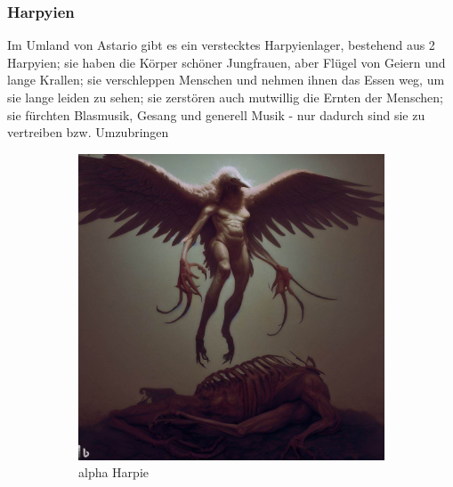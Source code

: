 \documentclass[11pt, twoside]{article}
\begin{document}
\subsubsection{Harpyien\label{harpie}}
\label{sec:orgedf501a}
Im Umland von Astario gibt es ein verstecktes Harpyienlager, bestehend aus 2 Harpyien; sie haben die Körper schöner Jungfrauen, aber Flügel von Geiern und lange Krallen; sie verschleppen Menschen und nehmen ihnen das Essen weg, um sie lange leiden zu sehen; sie zerstören auch mutwillig die Ernten der Menschen; sie fürchten Blasmusik, Gesang und generell Musik - nur dadurch sind sie zu vertreiben bzw. Umzubringen
\begin{figure}[H]
\centering
\caption{Harpyien}
\label{fig:harpie}
  \begin{subfigure}{0.3\textwidth}
    \centering
    \includegraphics[width=0.99\linewidth]{harpie1.jpeg}
    \caption{alpha Harpie}
  \end{subfigure}%
  \begin{subfigure}{0.3\textwidth}
    \centering

\end{subfigure}
\end{figure}
\end{document}
